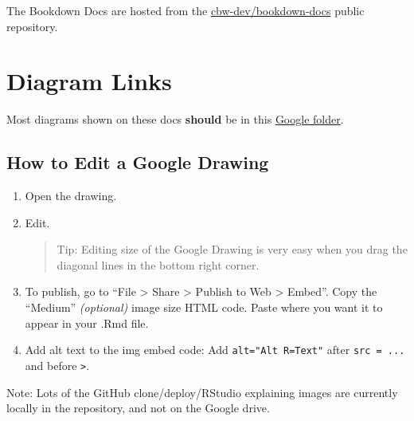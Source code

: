 \documentclass[
]{book}
\theoremstyle{definition}
\theoremstyle{definition}
\theoremstyle{definition}
\theoremstyle{definition}
\theoremstyle{remark}
\begin{document}
The Bookdown Docs are hosted from the \href{https://github.com/cbw-dev/bookdown-docs}{cbw-dev/bookdown-docs} public repository.

\section{Diagram Links}\label{diagram-links}

Most diagrams shown on these docs \textbf{should} be in this \href{https://drive.google.com/drive/folders/136sy6WIiSG3tBFVpHt8yQwLakB4TFJvn?usp=sharing}{Google folder}.

\subsection{How to Edit a Google Drawing}\label{how-to-edit-a-google-drawing}

\begin{enumerate}
\def\labelenumi{\arabic{enumi}.}
\item
  Open the drawing.
\item
  Edit.

  \begin{quote}
  Tip: Editing size of the Google Drawing is very easy when you drag the diagonal lines in the bottom right corner.
  \end{quote}
\item
  To publish, go to ``File \textgreater{} Share \textgreater{} Publish to Web \textgreater{} Embed''. Copy the ``Medium'' \emph{(optional)} image size HTML code. Paste where you want it to appear in your .Rmd file.
\item
  Add alt text to the img embed code: Add \texttt{alt="Alt\ R=Text"} after \texttt{src\ =\ ...} and before \texttt{\textgreater{}}.
\end{enumerate}

Note: Lots of the GitHub clone/deploy/RStudio explaining images are currently locally in the repository, and not on the Google drive.

  
\end{document}

